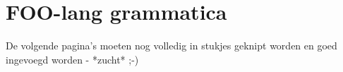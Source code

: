 \chapter{FOO-lang grammatica}
\label{appendix:foo-lang-grammar}

\TODO De volgende pagina's moeten nog volledig in stukjes geknipt worden en
goed ingevoegd worden - *zucht* ;-)



